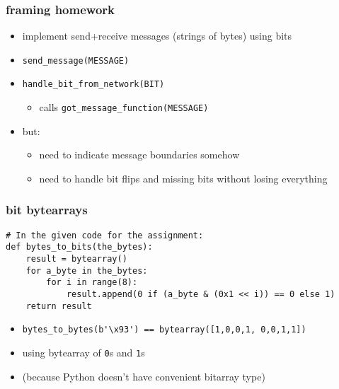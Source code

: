 \begin{frame}\frametitle{framing homework}
    \begin{itemize}
    \item implement send+receive messages (strings of bytes) using bits
    \item \texttt{send\_message(MESSAGE)}
    \item \texttt{handle\_bit\_from\_network(BIT)}
        \begin{itemize}
        \item calls \texttt{got\_message\_function(MESSAGE)}
        \end{itemize}
    \vspace{.5cm}
    \item but:
        \begin{itemize}
        \item need to indicate message boundaries somehow
        \item need to handle bit flips and missing bits without losing everything
        \end{itemize}
    \end{itemize}
\end{frame}

\begin{FragileFrame}
\frametitle{bit bytearrays}
\begin{Verbatim}[fontsize=\fontsize{9}{10}]
# In the given code for the assignment:
def bytes_to_bits(the_bytes):
    result = bytearray()
    for a_byte in the_bytes:
        for i in range(8):
            result.append(0 if (a_byte & (0x1 << i)) == 0 else 1)
    return result
\end{Verbatim}
\begin{itemize}
    \item \verb|bytes_to_bytes(b'\x93') == bytearray([1,0,0,1, 0,0,1,1])|
    \item using bytearray of \texttt{0}s and \texttt{1}s
    \item (because Python doesn't have convenient bitarray type)
\end{itemize}
\end{FragileFrame}
